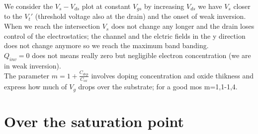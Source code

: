 We consider the $V_s-V_{ds}$ plot at constant $V_{gs}$ by increasing $V_{ds}$ we have $V_s$ closer to the $V_t'$ (threshold voltage also at the drain) and the onset of weak inversion. When we reach the intersection $V_s$ does not change any longer and the drain loses control of the electrostatics; the channel and the elctric fields in the y direction does not change anymore so we reach the maximum band banding.\\ $Q_{inv}=0$ does not means really zero but negligible electron concentration (we are in weak inversion).\\
The parameter $m=1+\frac{C_{dep}}{C_{ox}}$ involves doping concentration and oxide thikness and express how much of $V_g$ drops over the substrate; for a good mos m=1,1-1,4.\\



\section{Over the saturation point}

